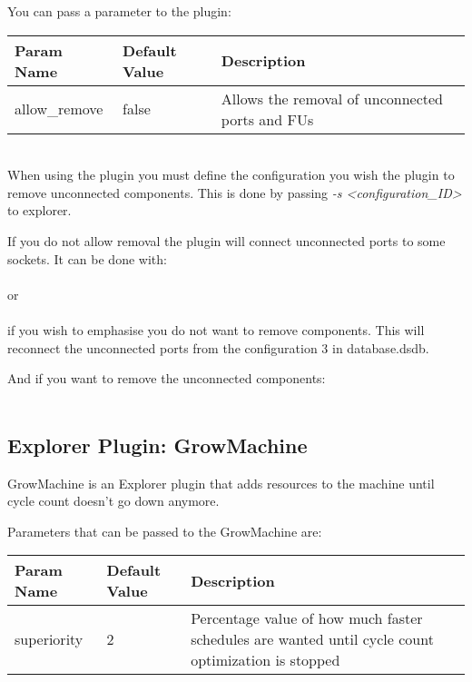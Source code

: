 \documentclass[twoside]{tceusermanual}
\begin{document}
You can pass a parameter to the plugin:

\begin{tabular}{p{}p{}
                p{}}
\textbf{Param Name} &\textbf{Default Value} &\textbf{Description} \\
\hline
allow\_remove & false & Allows the removal of unconnected ports and FUs \\
\end{tabular}\\

When using the plugin you must define the configuration you wish the plugin
to remove unconnected components. This is done by passing 
\textit{-s <configuration\_ID>} to explorer.

If you do not allow removal the plugin will connect unconnected ports to some
sockets. It can be done with: \\
\\
or \\
\\
if you wish to emphasise you do not want to remove components. This will
reconnect the unconnected ports from the configuration 3 in database.dsdb.

And if you want to remove the unconnected components: \\
\\

\subsection{Explorer Plugin: GrowMachine}
GrowMachine is an Explorer plugin that adds resources to the machine until
cycle count doesn't go down anymore.

Parameters that can be passed to the GrowMachine are:

\begin{tabular}{p{}p{}
                p{}}
\textbf{Param Name} &\textbf{Default Value} &\textbf{Description} \\
\hline
superiority & 2 & Percentage value of how much faster schedules are wanted
    until cycle count optimization is stopped \\
\end{tabular}\\
\end{document}
